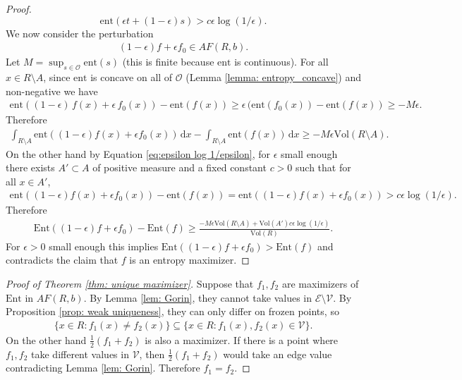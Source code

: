 \documentclass[11pt]{article}
\theoremstyle{remark}
\theoremstyle{definition}
\newcommand{\ent}{\text{ent}}
\newcommand{\Ent}{\text{Ent}}
\newcommand{\mc}[1]{\mathcal{#1}}
\newcommand{\dd}{\mathrm{d}}
\begin{document}
\begin{proof}
    \begin{equation}\label{eq:epsilon log 1/epsilon}
        \ent(\epsilon t + (1-\epsilon) s ) > c \epsilon \log(1/\epsilon).
    \end{equation}
    We now consider the perturbation 
    \begin{align*}
        (1-\epsilon) f + \epsilon f_0 \in AF(R, b).
    \end{align*}
    Let $M = \sup_{s\in \mc O} \ent(s)$ (this is finite because $\ent$ is continuous). For all $x\in R \setminus A$, since $\ent$ is concave on all of $\mc O$ (Lemma \ref{lemma: entropy_concave}) and non-negative we have 
    \begin{align*}
        \ent( (1-\epsilon)\, f(x) + \epsilon \, f_0(x) ) -\ent(f(x)) \geq \epsilon \, ( \ent(f_0(x)) - \ent(f(x)) \geq -M \epsilon. 
    \end{align*}
    Therefore 
    \begin{align*}
        \int_{R\setminus A} \ent((1-\epsilon) f(x) + \epsilon f_0(x))\, \dd x - \int_{R\setminus A} \ent(f(x))\, \dd x \geq - M \epsilon \text{Vol}(R\setminus A).
    \end{align*}
    On the other hand by Equation \eqref{eq:epsilon log 1/epsilon}, for $\epsilon$ small enough there exists $A'\subset A$ of positive measure and a fixed constant $c>0$ such that for all $x\in A'$, 
    \begin{align*}
        \ent( (1-\epsilon) f(x) + \epsilon f_0(x)) - \ent(f(x))= \ent( (1-\epsilon) f(x) + \epsilon f_0(x)) > c \epsilon \log (1/\epsilon). 
    \end{align*}
    Therefore 
    \begin{align*}
        \Ent( (1-\epsilon) f + \epsilon f_0) -\Ent(f) \geq \frac{-M \epsilon \text{Vol}(R\setminus A) + \text{Vol}(A') c \epsilon \log (1/\epsilon)}{\text{Vol}(R)}.
    \end{align*}
    For $\epsilon>0$ small enough this implies $\Ent( (1-\epsilon) f + \epsilon f_0) >\Ent(f)$ and contradicts the claim that $f$ is an entropy maximizer. 
\end{proof}

\begin{proof}[Proof of Theorem \ref{thm: unique maximizer}]
    Suppose that $f_1, f_2$ are maximizers of $\Ent$ in $AF(R,b)$. By Lemma \ref{lem: Gorin}, they cannot take values in $\mc E\setminus \mc V$. By Proposition \ref{prop: weak uniqueness}, they can only differ on frozen points, so
    \begin{align*}
        \{x\in R : f_1(x) \neq f_2(x) \} \subseteq \{x \in R : f_1(x), f_2(x) \in \mc V\}.
    \end{align*}
    On the other hand $\frac{1}{2} (f_1 + f_2)$ is also a maximizer. If there is a point where $f_1, f_2$ take different values in $\mc V$, then $\frac{1}{2}(f_1 + f_2)$ would take an edge value contradicting Lemma \ref{lem: Gorin}. Therefore $f_1 = f_2$. 
\end{proof}
\end{document}
